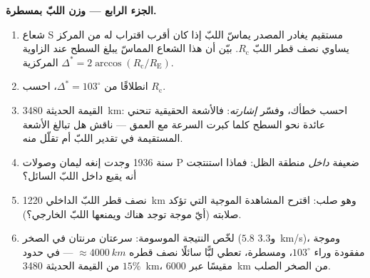 \begin{problem}
\medskip\noindent\textbf{الجزء الرابع --- وزن اللبّ بمسطرة.}
\begin{enumerate}[resume]
  \item شعاع S مستقيم يغادر المصدر يماسّ اللبّ إذا كان أقرب
        اقتراب له من المركز يساوي نصف قطر اللبّ
        $R_{\text{c}}$. بيّن أن هذا الشعاع المماسّ يبلغ
        السطح عند الزاوية المركزية $\Delta^* =
        2\arccos(R_{\text{c}}/R_{\text{E}})$.
  \item انطلاقًا من $\Delta^* = 103^\circ$، احسب $R_{\text{c}}$.
  \item القيمة الحديثة \qty{3480}{km}: احسب خطأك، وفسّر
        \emph{إشارته}: فالأشعة الحقيقية تنحني عائدة نحو
        السطح كلما كبرت السرعة مع العمق --- ناقش هل تبالغ
        الأشعة المستقيمة في تقدير اللبّ أم تقلّل منه.
  \item سنة 1936 وجدت إنغه ليمان وصولات P ضعيفة \emph{داخل}
        منطقة الظل: فماذا استنتجت أنه يقبع داخل اللبّ
        السائل؟
  \item نصف قطر اللبّ الداخلي \qty{1220}{km} وهو صلب:
        اقترح المشاهدة الموجية التي تؤكد صلابته
        (أيّ موجة توجد هناك ويمنعها اللبّ الخارجي؟).
  \item لخّص النتيجة الموسومة: سرعتان مرنتان في الصخر
        ($5.8$ و\qty{3.3}{km/s})، وموجة مفقودة وراء
        $103^\circ$، ومسطرة، تعطي لبًّا سائلًا نصف قطره
        $\approx \qty{4000}{km}$ --- في حدود $15\%$ من القيمة
        الحديثة \qty{3480}{km}، مقيسًا عبر \qty{6000}{km} من
        الصخر الصلب.
\end{enumerate}
\end{problem}
